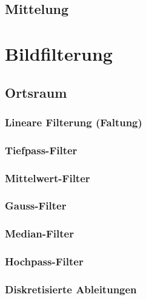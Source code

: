 \documentclass[a4paper, 11pt, accentcolor = tud3b]{tudreport}
\begin{document}
			\subsection{Mittelung} %

		\section{Bildfilterung} %

			\subsection{Ortsraum} %

				\subsubsection{Lineare Filterung (Faltung)} %

				\subsubsection{Tiefpass-Filter} %

				\subsubsection{Mittelwert-Filter} %

				\subsubsection{Gauss-Filter} %

				\subsubsection{Median-Filter} %

				\subsubsection{Hochpass-Filter} %

				\subsubsection{Diskretisierte Ableitungen} %
\end{document}
